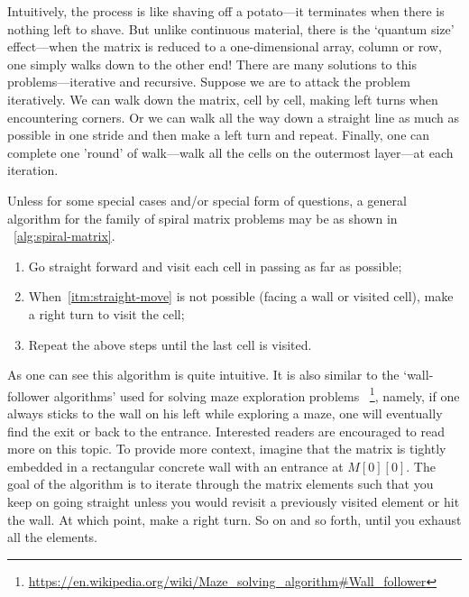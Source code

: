 Intuitively, the process is like shaving off a potato---it
terminates when there is nothing left to shave.
But unlike continuous material, there is the `quantum size' effect---when the matrix is reduced
to a one-dimensional array, column or row, one simply walks down to the other end!
There are many solutions to this problems---iterative and recursive.
Suppose we are to attack the problem iteratively.
We can walk down the matrix, cell by cell, making left turns when encountering corners.
Or we can walk all the way down a straight line as much as possible in one stride and then make a
left turn and repeat.
Finally, one can complete one 'round' of walk---walk all the cells on the
outermost layer---at each iteration.

Unless for some special cases and/or special form of questions,
a general algorithm for the family of spiral matrix problems may be as shown in
~\autoref{alg:spiral-matrix}.
\begin{alisting}
    \caption{\label{alg:spiral-matrix}Generic algorithm for matrix spiralization.}
    \begin{enumerate}[label=\textbf{Step.\arabic*}]
        \label{enum:algorithm}
        \item\label{itm:straight-move} Go straight forward
        and visit each cell in passing as far as possible;
        \item\label{itm:turn-right} When~\ref{itm:straight-move} is not possible
        (facing a wall or visited cell), make a right turn to visit the cell;
        \item\label{itm:goto-terminate} Repeat the above steps until the last cell is visited.
    \end{enumerate}
\end{alisting}
As one can see this algorithm is quite intuitive.
It is also similar to the `wall-follower algorithms' used for solving maze
exploration problems
~\footnote{\url{https://en.wikipedia.org/wiki/Maze_solving_algorithm\#Wall_follower}}, namely,
if one always sticks to the wall on his left while exploring a maze, one will
eventually find the exit or back to the entrance.
Interested readers are encouraged to read more on this topic.
To provide more context,
imagine that the matrix is tightly embedded in a rectangular concrete wall with an entrance at
$M[0][0]$.
The goal of the algorithm is to iterate through the matrix elements such that you keep on going
straight unless
you would revisit a previously visited element or hit the wall.
At which point, make a right turn.
So on and so forth, until you exhaust all the elements.

